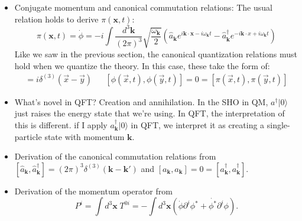 \documentclass[12pt, oneside]{article}   	%
\theoremstyle{definition}
\begin{document}
\begin{itemize}
	\item Conjugate momentum and canonical commutation relations: The usual relation holds to derive $\pi(\bm x, t)$:
	\begin{equation}
		\pi(\bm x, t) = \dot{\phi} = -i\int \frac{d^3\bm k}{(2\pi)^3} \sqrt{\frac{\omega_{\bm k}}{2}} \left(\hat{a}_{\bm k} e^{i\bm k\cdot\bm x - i\omega_{\bm k} t} - \hat{a}^\dagger_{\bm k} e^{-i\bm k\cdot x + i\omega_{\bm k} t}\right)
	\end{equation}
	Like we saw in the previous section, the canonical quantization relations must hold when we quantize the theory. In this case, these take the form of:
	\begin{align}
		[\phi(\vec x, t), \pi(\vec y, t)] = i\delta^{(3)}(\vec x - \vec y) && [\phi(\vec x, t), \phi(\vec y, t)] = 0 = [\pi(\vec x, t), \pi(\vec y, t)]
	\end{align}

	
	\item What's novel in QFT? Creation and annihilation. In the SHO in QM, $a^\dagger |0\rangle$ just raises the energy state that we're using. In QFT, the interpretation of this is different. if I apply $a_{\bm k}^\dagger |0\rangle$ in QFT, we interpret it as creating a single-particle state with momentum $\bm k$. 
	
	\item Derivation of the canonical commutation relations from $[\hat a_{\bm k}, \hat a_{\bm k}^\dagger] = (2\pi)^3 \delta^{(3)}(\bm k - \bm k')$ and $[a_{\bm k}, a_{\bm k}] = 0 = [a_{\bm k}^\dagger, a_{\bm k}^\dagger]$. 
	
	\item Derivation of the momentum operator from 
	\begin{equation}
		P^i = \int d^3\bm x \; T^{0i} = - \int d^3\bm x (\dot{\phi}\partial^i \phi^* + \dot{\phi^*} \partial^i\phi).
	\end{equation}
	
\end{itemize}

\end{document}
